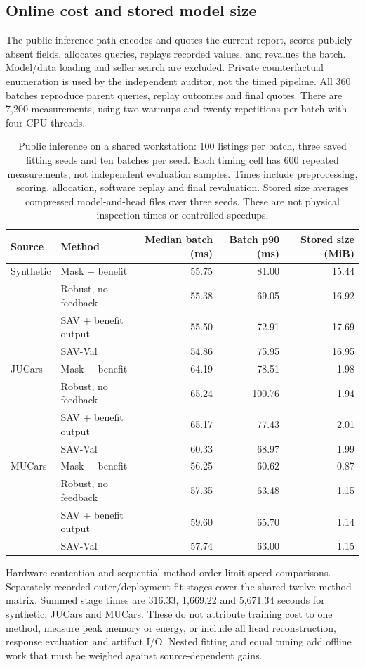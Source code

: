 \subsection{Online cost and stored model size}
The public inference path encodes and quotes the current report, scores
publicly absent fields, allocates queries, replays recorded values, and
revalues the batch. Model/data loading and seller search are excluded.
Private counterfactual enumeration is used by the independent auditor,
not the timed pipeline. All 360 batches reproduce parent queries, replay
outcomes and final quotes. There are 7,200 measurements, using two warmups
and twenty repetitions per batch with four CPU threads.

\begin{table}[t]
\centering
\caption{Public inference on a shared workstation: 100 listings per batch,
three saved fitting seeds and ten batches per seed. Each timing cell has
600 repeated measurements, not independent evaluation samples. Times
include preprocessing, scoring, allocation, software replay and final
revaluation. Stored size averages compressed model-and-head files over
three seeds. These are not physical inspection times or controlled speedups.}
\label{tab:online_resources}
\begin{tabular}{llrrr}
\toprule
Source & Method & Median batch (ms) & Batch p90 (ms) & Stored size (MiB)\\
\midrule
Synthetic & Mask + benefit & 55.75 & 81.00 & 15.44\\
 & Robust, no feedback & 55.38 & 69.05 & 16.92\\
 & SAV + benefit output & 55.50 & 72.91 & 17.69\\
 & SAV-Val & 54.86 & 75.95 & 16.95\\
\midrule
JUCars & Mask + benefit & 64.19 & 78.51 & 1.98\\
 & Robust, no feedback & 65.24 & 100.76 & 1.94\\
 & SAV + benefit output & 65.17 & 77.43 & 2.01\\
 & SAV-Val & 60.33 & 68.97 & 1.99\\
\midrule
MUCars & Mask + benefit & 56.25 & 60.62 & 0.87\\
 & Robust, no feedback & 57.35 & 63.48 & 1.15\\
 & SAV + benefit output & 59.60 & 65.70 & 1.14\\
 & SAV-Val & 57.74 & 63.00 & 1.15\\
\bottomrule
\end{tabular}
\end{table}

Hardware contention and sequential method order limit speed comparisons.
Separately recorded outer/deployment fit stages cover the shared twelve-method
matrix. Summed stage times are 316.33, 1,669.22 and 5,671.34 seconds for
synthetic, JUCars and MUCars. These do not attribute training cost to one
method, measure peak memory or energy, or include all head reconstruction,
response evaluation and artifact I/O. Nested fitting and equal tuning add
offline work that must be weighed against source-dependent gains.
